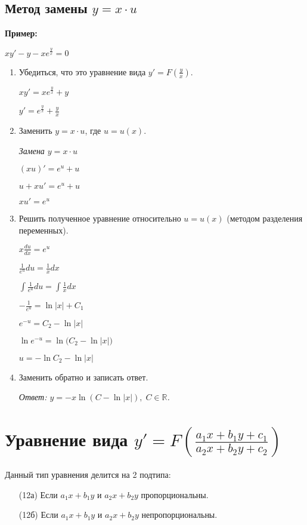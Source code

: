 \documentclass[10pt, a4paper]{article}
\begin{document}
\subsection{Метод замены $y = x \cdot u$}
\textbf{Пример:}
\par $xy' - y - xe^{\frac{y}{x}} = 0$
\begin{enumerate}
    \item Убедиться, что это уравнение вида $y' = F(\frac{y}{x})$.
        \par $xy' = xe^{\frac{y}{x}} + y$
        \par $y' = e^{\frac{y}{x}} + \frac{y}{x}$
    \item Заменить $y = x \cdot u$, где $u = u(x)$.
        \par\textit{Замена $y = x \cdot u$}
        \par $(xu)' = e^u + u$
        \par $u + xu' = e^u + u$
        \par $xu' = e^u$
    \item Решить полученное уравнение относительно $u = u(x)$ (методом разделения переменных).
        \par $x\frac{du}{dx} = e^u$
        \par $\frac{1}{e^u}du = \frac{1}{x}dx$
        \par $\int{\frac{1}{e^u}du} = \int{\frac{1}{x}dx}$
        \par $-\frac{1}{e^u} = \ln{|x|} + C_1$
        \par $e^{-u} = C_2 - \ln{|x|}$
        \par $\ln{e^{-u}} = \ln{(C_2 - \ln{|x|)}}$
        \par $u = -\ln{C_2 - \ln{|x|}}$
    \item Заменить обратно и записать ответ.
        \par\textit{Ответ: $y = -x\ln{(C - \ln{|x|})},\;C \in \mathbb{R}$.}
\end{enumerate}


\section{Уравнение вида  $y' = F(\frac{a_1x + b_1y + c_1}{a_2x + b_2y + c_2})$}
Данный тип уравнения делится на 2 подтипа:
\begin{enumerate}
    \item[(12а)] Если $a_1x + b_1y$ и $a_2x + b_2y$ пропорциональны.
    \item[(12б)] Если $a_1x + b_1y$ и $a_2x + b_2y$ непропорциональны.
\end{enumerate}
\end{document}
